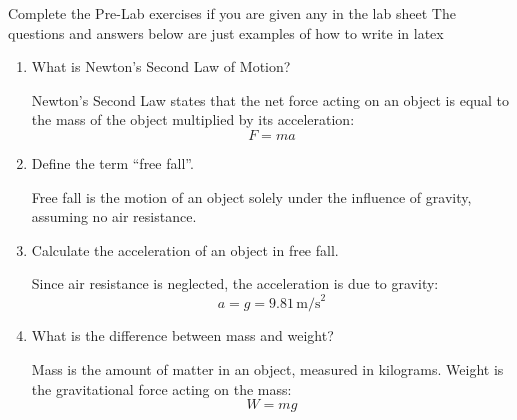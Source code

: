 Complete the Pre-Lab exercises if you are given any in the lab sheet
\newline
\newline
The questions and answers below are just examples of how to write in latex


\begin{enumerate}
	\item What is Newton’s Second Law of Motion?  %

	      Newton’s Second Law states that the net force acting on an object is equal to the mass of the object multiplied by its acceleration:
	      \[
		      F = ma
	      \]

	\item Define the term “free fall”.  %

	      Free fall is the motion of an object solely under the influence of gravity, assuming no air resistance.

	\item Calculate the acceleration of an object in free fall.  %

	      Since air resistance is neglected, the acceleration is due to gravity:
	      \[
		      a = g = 9.81 \, \text{m/s}^2
	      \]

	\item What is the difference between mass and weight?  %

	      Mass is the amount of matter in an object, measured in kilograms.
	      Weight is the gravitational force acting on the mass:
	      \[
		      W = mg
	      \]
\end{enumerate}

